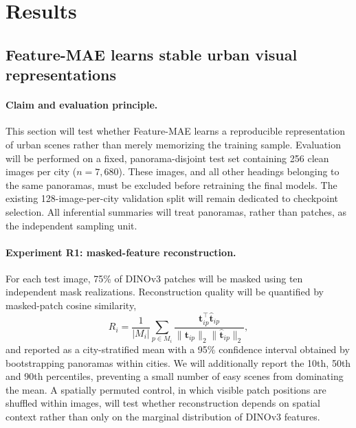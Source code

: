 
\section{Results}
\label{sec:results}

\subsection{Feature-MAE learns stable urban visual representations}
\label{sec:results_representation}

\paragraph{Claim and evaluation principle.}
This section will test whether Feature-MAE learns a reproducible representation
of urban scenes rather than merely memorizing the training sample. Evaluation
will be performed on a fixed, panorama-disjoint test set containing 256 clean
images per city ($n=7{,}680$). These images, and all other headings belonging to
the same panoramas, must be excluded before retraining the final models. The
existing 128-image-per-city validation split will remain dedicated to checkpoint
selection. All inferential summaries will treat panoramas, rather than patches,
as the independent sampling unit.

\paragraph{Experiment R1: masked-feature reconstruction.}
For each test image, 75\% of DINOv3 patches will be masked using ten independent
mask realizations. Reconstruction quality will be quantified by masked-patch
cosine similarity,
\begin{equation}
  R_i = \frac{1}{|M_i|}\sum_{p\in M_i}
  \frac{\mathbf{t}_{ip}^{\top}\widehat{\mathbf{t}}_{ip}}
  {\lVert\mathbf{t}_{ip}\rVert_2
   \lVert\widehat{\mathbf{t}}_{ip}\rVert_2},
\end{equation}
and reported as a city-stratified mean with a 95\% confidence interval obtained
by bootstrapping panoramas within cities. We will additionally report the 10th,
50th and 90th percentiles, preventing a small number of easy scenes from
dominating the mean. A spatially permuted control, in which visible patch
positions are shuffled within images, will test whether reconstruction depends
on spatial context rather than only on the marginal distribution of DINOv3
features.

